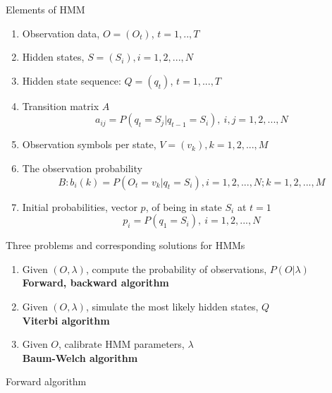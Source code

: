 \documentclass[final]{beamer}
\newlength{\onecolwid}
\begin{document}
\begin{frame}[t]
\begin{columns}[t]
\begin{column}{\onecolwid}
\begin{block}{ Elements of HMM}
\begin{enumerate}
 \item Observation data, $O=(O_t)$, $t=1,..,T$
 \vspace{.3cm}
 \item Hidden states, $S=(S_i) ,i=1,2,...,N$
 \vspace{.3cm}
 \item Hidden state sequence: $Q=(q_t)$, $t=1,...,T$
 \vspace{.3cm}
 \item Transition matrix $A$
$$a_{ij}=P(q_t=S_j|q_{t-1}=S_i),~i,j=1,2,...,N$$
\item Observation symbols per state, $V=(v_k), k=1,2,...,M$
\vspace{.5cm}
\item The observation probability
$$B: b_i(k) = P(O_t=v_k|q_t = S_i), i=1,2,...,N; k=1,2,...,M$$
\item Initial probabilities, vector $p$, of being in state $S_i$ at $t=1$ $$  p_i=P(q_1=S_i),~i=1, 2,...,N$$
 \end{enumerate}


\end{block}

   \begin{block}{Three problems and corresponding solutions for HMMs}

\begin{enumerate}
\item Given $(O,\lambda)$, compute the probability of observations, $P(O|\lambda)$\\
\alert{\textbf{Forward, backward algorithm}}
\item Given $(O,\lambda)$, simulate the most likely hidden states, $Q$\\
\alert{ \textbf{ Viterbi algorithm}}
 \item Given $O$, calibrate HMM parameters, $\lambda$\\
\alert{ \textbf{ Baum-Welch algorithm}}
\end{enumerate}
    \end{block}

\begin{block}{Forward algorithm}


\end{block}
\end{column}
\end{columns}
\end{frame}
\end{document}
